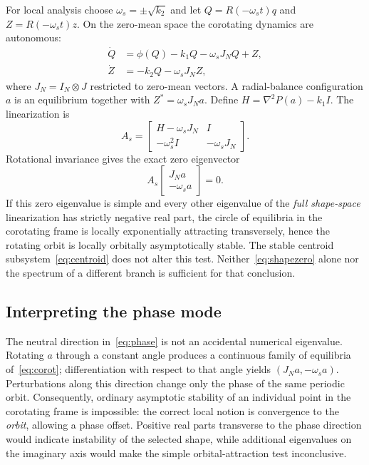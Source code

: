 \documentclass[conference]{IEEEtran}
\begin{document}
For local analysis choose $\omega_s=\pm\sqrt{k_2}$ and let $Q=R(-\omega_st)q$ and $Z=R(-\omega_st)z$. On the zero-mean space the corotating dynamics are autonomous:
\begin{align}
 \dot Q&=\phi(Q)-k_1Q-\omega_s J_N Q+Z,\nonumber\\
 \dot Z&=-k_2Q-\omega_s J_N Z,
 \label{eq:corot}
\end{align}
where $J_N=I_N\otimes J$ restricted to zero-mean vectors. A radial-balance configuration $a$ is an equilibrium together with $Z^*=\omega_sJ_Na$. Define $H=\nabla^2P(a)-k_1I$. The linearization is
\begin{equation}
 A_s=\begin{bmatrix}H-\omega_sJ_N&I\\
 -\omega_s^2I&-\omega_sJ_N\end{bmatrix}.
 \label{eq:jacobian}
\end{equation}
Rotational invariance gives the exact zero eigenvector
\begin{equation}
 A_s\begin{bmatrix}J_Na\\-\omega_sa\end{bmatrix}=0.
 \label{eq:phase}
\end{equation}
If this zero eigenvalue is simple and every other eigenvalue of the \emph{full shape-space} linearization has strictly negative real part, the circle of equilibria in the corotating frame is locally exponentially attracting transversely, hence the rotating orbit is locally orbitally asymptotically stable. The stable centroid subsystem~\eqref{eq:centroid} does not alter this test. Neither~\eqref{eq:shapezero} alone nor the spectrum of a different branch is sufficient for that conclusion.

\subsection{Interpreting the phase mode}
The neutral direction in~\eqref{eq:phase} is not an accidental numerical eigenvalue. Rotating $a$ through a constant angle produces a continuous family of equilibria of~\eqref{eq:corot}; differentiation with respect to that angle yields $(J_Na,-\omega_sa)$. Perturbations along this direction change only the phase of the same periodic orbit. Consequently, ordinary asymptotic stability of an individual point in the corotating frame is impossible: the correct local notion is convergence to the \emph{orbit}, allowing a phase offset. Positive real parts transverse to the phase direction would indicate instability of the selected shape, while additional eigenvalues on the imaginary axis would make the simple orbital-attraction test inconclusive.
\end{document}
